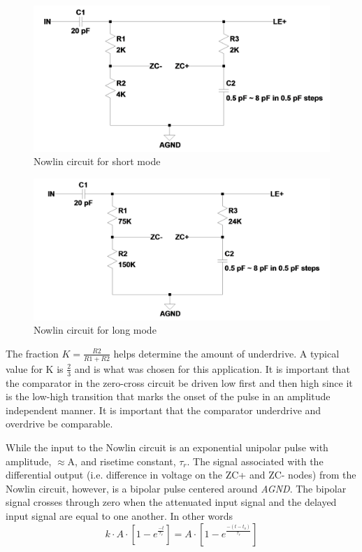 \documentclass[12pt,oneside,final]{siuethesis}
\theoremstyle{definition}
\begin{document}
\begin{figure}[htbp!]
\centering
\includegraphics[scale=.30,keepaspectratio=true]{../LTspice_Drawings/nowlin/nowlin_short.png} 
\caption{Nowlin circuit for short mode}
\label{fig:Nowlinshort}
\end{figure}

\begin{figure}[htbp!]
\centering
\includegraphics[scale=.30,keepaspectratio=true]{../LTspice_Drawings/nowlin/nowlin_long.png} 
\caption{Nowlin circuit for long mode}
\label{fig:Nowlinlong}
\end{figure}

\par The fraction $K = \frac{R2}{R1 + R2}$ helps determine the amount of underdrive. A typical value for K is $\frac{2}{3}$ and is what was chosen for this application. It is important that the comparator in the zero-cross circuit be driven low first and then high since it is the low-high transition that marks the onset of the pulse in an amplitude independent manner. It is important that the comparator underdrive and overdrive be comparable.
\par While the input to the Nowlin circuit is an exponential unipolar pulse with amplitude, $\approx$A, and risetime constant, $\tau_{r}$. The signal associated with the differential output (i.e. difference in voltage on the ZC+ and ZC- nodes) from the Nowlin circuit, however, is a bipolar pulse centered around \emph{AGND}. The bipolar signal crosses through zero when the attenuated input signal and the delayed input signal are equal to one another. In other words
\begin{equation}
k \cdot A \cdot \left[ 1 - e^{\frac{-t}{\tau_r}} \right] = A \cdot \left[ 1 - e^{\frac{-(t - t_o)}{\tau_r}} \right]
\end{equation}
\end{document}
